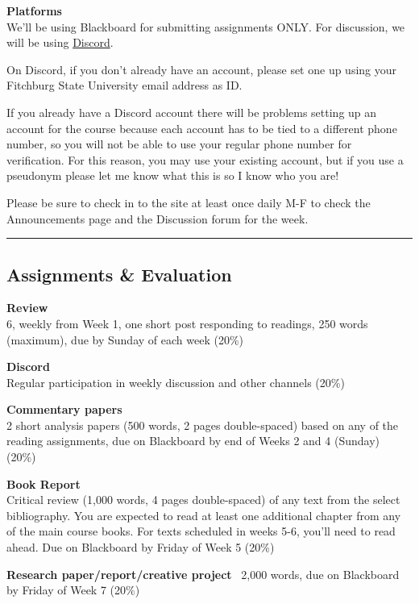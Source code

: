 \documentclass[
  letterpaper,
  DIV=11,
  numbers=noendperiod,
  oneside]{scrartcl}
\begin{document}
\textbf{Platforms}\\
We'll be using Blackboard for submitting assignments ONLY. For
discussion, we will be using
\href{https://discord.gg/GUSz99EP}{Discord}.

On Discord, if you don't already have an account, please set one up
using your Fitchburg State University email address as ID.

If you already have a Discord account there will be problems setting up
an account for the course because each account has to be tied to a
different phone number, so you will not be able to use your regular
phone number for verification. For this reason, you may use your
existing account, but if you use a pseudonym please let me know what
this is so I know who you are!

Please be sure to check in to the site at least once daily M-F to check
the Announcements page and the Discussion forum for the week.

\begin{center}\rule{0.5\linewidth}{0.5pt}\end{center}

\subsection{Assignments \& Evaluation}\label{assignments-evaluation}

\textbf{Review}\\
6, weekly from Week 1, one short post responding to readings, 250 words
(maximum), due by Sunday of each week (20\%)

\textbf{Discord}\\
Regular participation in weekly discussion and other channels (20\%)

\textbf{Commentary papers}\\
2 short analysis papers (500 words, 2 pages double-spaced) based on any
of the reading assignments, due on Blackboard by end of Weeks 2 and 4
(Sunday) (20\%)

\textbf{Book Report}\\
Critical review (1,000 words, 4 pages double-spaced) of any text from
the select bibliography. You are expected to read at least one
additional chapter from any of the main course books. For texts
scheduled in weeks 5-6, you'll need to read ahead. Due on Blackboard by
Friday of Week 5 (20\%)

\textbf{Research paper/report/creative project}~ 2,000 words, due on
Blackboard by Friday of Week 7 (20\%)
\end{document}
